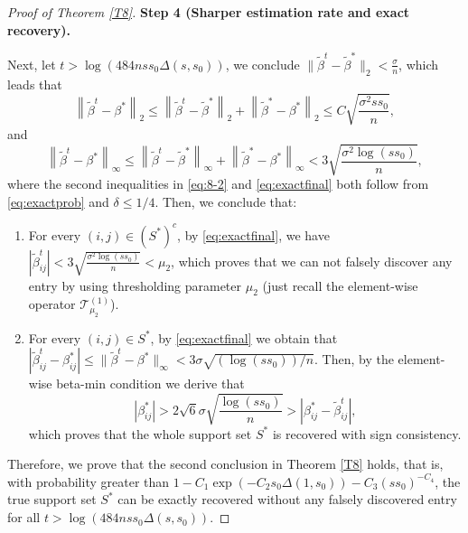 \documentclass[12pt]{article}
\newtheorem{proof}{Proof}
\begin{document}
\begin{appendix}
\begin{proof}[Proof of Theorem \ref{T8}]
\textbf{Step 4 (Sharper estimation rate and exact recovery).} 

Next, let $t >  \log \left(  484 n ss_0 \Delta(s,s_0) \right)$, we conclude $ \|\tilde \beta^{t} - \tilde \beta^*  \|_2 < \frac{ \sigma }n$, which leads that 
\begin{equation}\label{eq:8-2}
\left\|\tilde \beta^t -\beta^* \right\|_2
\le \left\|\tilde \beta^t -\tilde \beta^* \right\|_2 + \left\|\tilde \beta^* - \beta^* \right\|_2
\le C\sqrt{\frac{ \sigma^2 ss_0 }{n}},
\end{equation}
and 
\begin{equation}\label{eq:exactfinal}
\left\|\tilde \beta^t -\beta^* \right\|_\infty
\le \left\|\tilde \beta^t -\tilde \beta^* \right\|_\infty + \left\|\tilde \beta^* - \beta^* \right\|_\infty
< 3 \sqrt{\frac{ \sigma^2 \log(ss_0)}n},
\end{equation}
where the second inequalities in \eqref{eq:8-2} and \eqref{eq:exactfinal} both follow from \eqref{eq:exactprob} and $\delta \le 1/4$.
Then, we conclude that:
\begin{enumerate} 
    \item For every $ (i,j) \in (S^*)^c$, by \eqref{eq:exactfinal}, we have $|\tilde \beta^t_{ij} | <3 \sqrt{\frac{ \sigma^2 \log(ss_0)}{n }} < \mu_2$, which proves that we can not falsely discover any entry by using thresholding parameter $\mu_2$ (just recall the element-wise operator $\mathcal T_{\mu_2}^{(1)} $).

    \item For every $ (i,j) \in S^*$, by \eqref{eq:exactfinal} we obtain that $| \tilde \beta^t_{ij} - \beta_{ij}^*| \le \|\tilde \beta^t -\beta^*  \|_\infty   <3  \sigma \sqrt{ (\log(ss_0))/ n}$.
    Then, by the element-wise beta-min condition we derive that
    \begin{equation*}
        | \beta_{ij}^*| 
        > 2\sqrt{6}\sigma  \sqrt{\frac{\log(ss_0)}n}
        > | \beta_{ij}^* - \tilde \beta^t_{ij} |,
    \end{equation*}
    which proves that the whole support set $S^*$ is recovered with sign consistency.
\end{enumerate}

Therefore, we prove that the second conclusion in Theorem \ref{T8} holds, that is, with probability greater than $1- C_1 \exp(-C_2 s_0 \Delta(1,s_0))-C_3 (ss_0)^{-C_4}$, the true support set $S^*$ can be exactly recovered without any falsely discovered entry for all $ t > \log \left(  484n ss_0 \Delta(s,s_0) \right)$.
\end{proof}


\end{appendix}
\end{document}
